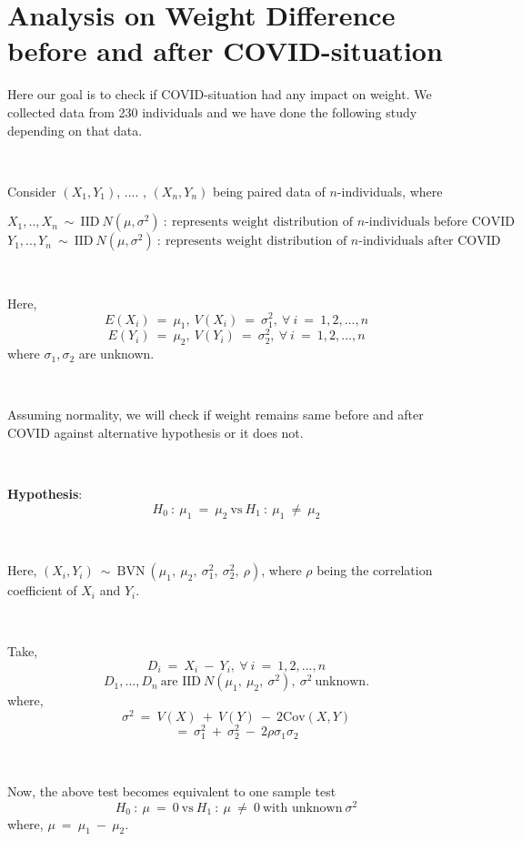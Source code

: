 \section{Analysis on Weight Difference before and after COVID-situation}

Here our goal is to check if COVID-situation had any impact on weight. We collected data from 230 individuals and we have done the following study depending on that data.

\ 

Consider $(X_{1}, Y_{1})$, .... , $(X_{n}, Y_{n})$ being paired data of $n$-individuals, where

$$X_{1}, .. , X_{n} \ \sim \ \text{IID} \ N(\mu, \sigma^{2}) \ : \ \text{represents weight distribution of $n$-individuals before COVID}$$
$$Y_{1}, .. , Y_{n} \ \sim \ \text{IID} \ N(\mu, \sigma^{2}) \ : \ \text{represents weight distribution of $n$-individuals after COVID}$$

\ 

Here, 
$$E(X_{i}) \ = \ \mu_{1} , \ V(X_{i}) \ = \ \sigma_{1}^{2} , \ \forall \ i \ = \ 1, 2, ... , n$$
$$E(Y_{i}) \ = \ \mu_{2} , \ V(Y_{i}) \ = \ \sigma_{2}^{2} , \ \forall \ i \ = \ 1, 2, ... , n$$
where $\sigma_{1}, \sigma_{2}$ are unknown.

\ 

Assuming normality, we will check if weight remains same before and after COVID against alternative hypothesis or it does not.

\ 

\textbf{Hypothesis}:
$$H_{0} \ : \ \mu_{1} \ = \ \mu_{2} \ \text{vs} \ H_{1} \ : \ \mu_{1} \ \neq \ \mu_{2}$$

\ 

Here, $(X_{i}, Y_{i}) \ \sim \ \text{BVN} \ (\mu_{1}, \ \mu_{2}, \ \sigma_{1}^{2}, \ \sigma_{2}^{2}, \ \rho)$, where $\rho$ being the correlation coefficient of $X_{i}$ and $Y_{i}$.

\ 

Take, 
$$D_{i} \ = \ X_{i} \ - \ Y_{i}, \ \forall \ i \ = \ 1, 2, ... , n$$
$$D_{1}, ..., D_{n} \ \text{are IID} \ N(\mu_{1}, \ \mu_{2}, \ \sigma^{2}), \ \sigma^{2} \ \text{unknown}.$$
where,
$$\sigma^{2} \ = \ V(X) \ + \ V(Y) \ - \ 2 \text{Cov} (X, Y)$$
$$= \ \sigma_{1}^{2} \ + \ \sigma_{2}^{2} \ - \ 2 \rho \sigma_{1} \sigma_{2}$$

\ 

Now, the above test becomes equivalent to one sample test
$$H_{0} \ : \ \mu \ = \ 0 \ \text{vs} \ H_{1} \ : \ \mu \ \neq \ 0 \ \text{with unknown} \ \sigma^{2}$$
where, $\mu \ = \ \mu_{1} \ - \ \mu_{2}$.

